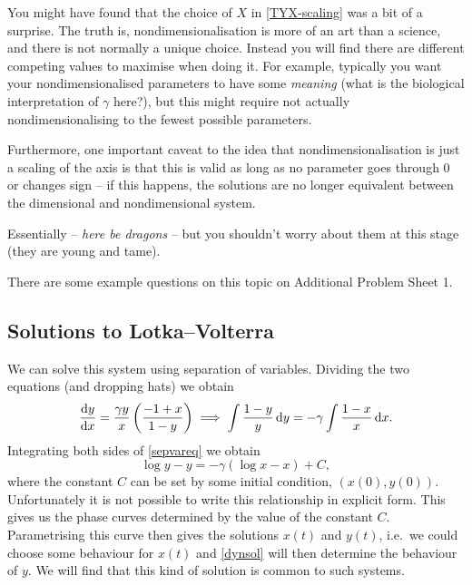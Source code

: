 \documentclass[main.tex]{subfiles}
\begin{document}
\begin{nem}
You might have found that the choice of $X$ in \cref{TYX-scaling} was a bit of a surprise. The truth is, nondimensionalisation is more of an art than a science, and there is not normally a unique choice. Instead you will find there are different competing values to maximise when doing it. For example, typically you want your nondimensionalised parameters to have some \emph{meaning} (what is the biological interpretation of $\gamma$ here?), but this might require not actually nondimensionalising to the fewest possible parameters.

Furthermore, one important caveat to the idea that nondimensionalisation is just a scaling of the axis is that this is valid as long as no parameter goes through 0 or changes sign -- if this happens, the solutions are no longer equivalent between the dimensional and nondimensional system.  

Essentially -- \emph{here be dragons} -- but you shouldn't worry about them at this stage (they are young and tame).
\end{nem}

\begin{do-it-yourself}
	There are some example questions on this topic on Additional Problem Sheet 1.
\end{do-it-yourself}

\subsection{Solutions to Lotka--Volterra}%
%
We can solve this system using separation of variables. Dividing the two equations (and dropping hats) we obtain
\begin{equation}
\label{sepvareq}
\fd{y}{x}= \frac{\gamma y}{x}\left(\frac{-1+x}{1- y}\right)\implies \int \frac{1-y}{y} \dy = -\gamma \int \frac{1-x}{x} \dx.
\end{equation}
Integrating both sides of \cref{sepvareq} we obtain 
\begin{equation}
\label{dynsol}
\log y-y =- \gamma(\log x -x) + C,
\end{equation}
where the constant $C$ can be set by some initial condition, $(x(0),y(0))$. Unfortunately it is not possible to write this relationship in explicit form. This gives us the phase curves determined by the value of the constant $C$. Parametrising this curve then gives the solutions $x(t)$ and $y(t)$, i.e.\ we could choose some behaviour for $x(t)$ and \cref{dynsol} will then determine the behaviour of $y$. We will find that this kind of solution is common to such systems.
\end{document}
